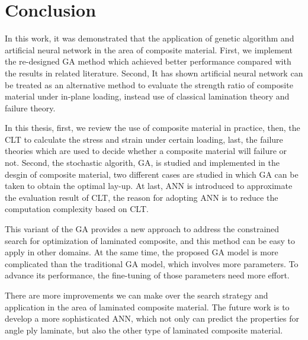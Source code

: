 
\chapter{Conclusion} %

\label{Chapter5} %

In this work, it was demonstrated that the application of genetic algorithm and
artificial neural network in the area of composite material. First, we implement
the re-designed GA method which achieved better performance compared with the
results in related literature. Second,  It has shown artificial neural network
can be treated as an alternative method to evaluate the strength ratio of
composite material under in-plane loading, instead use of classical lamination
theory and failure theory.


In this thesis, first, we review the use of composite material in practice,
then, the CLT to calculate the stress and strain under certain loading, last,
the failure theories which are used to decide whether a composite material will
failure or not. Second, the stochastic algorith, GA, is studied and implemented
in the desgin of composite material, two different cases are studied in which GA
can be taken to obtain the optimal lay-up. At last, ANN is introduced to
approximate the evaluation result of CLT, the reason for adopting ANN is to
reduce the computation complexity based on CLT.

This variant of the GA provides a new approach to address the constrained
search for optimization of laminated composite, and this method can be easy
to apply in other domains. At the same time, the proposed GA model is more
complicated than the traditional GA model, which involves more parameters. To
advance its performance, the fine-tuning of those parameters need more effort. 

There are more improvements we can make over the search strategy and
application in the area of laminated composite material. The future work is to
develop a more sophisticated ANN, which not only can predict the properties for
angle ply laminate, but also the other type of laminated composite material.
